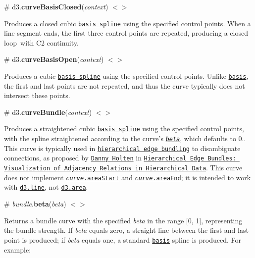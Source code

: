 \label{_curveBasisClosed}%
\# d3.{\bfseries curve\+Basis\+Closed}({\itshape context}) \href{https://github.com/d3/d3-shape/blob/master/src/curve/basisClosed.js}{\tt $<$$>$}



Produces a closed cubic \href{https://en.wikipedia.org/wiki/B-spline}{\tt basis spline} using the specified control points. When a line segment ends, the first three control points are repeated, producing a closed loop with C2 continuity.

\label{_curveBasisOpen}%
\# d3.{\bfseries curve\+Basis\+Open}({\itshape context}) \href{https://github.com/d3/d3-shape/blob/master/src/curve/basisOpen.js}{\tt $<$$>$}



Produces a cubic \href{https://en.wikipedia.org/wiki/B-spline}{\tt basis spline} using the specified control points. Unlike \href{#basis}{\tt basis}, the first and last points are not repeated, and thus the curve typically does not intersect these points.

\label{_curveBundle}%
\# d3.{\bfseries curve\+Bundle}({\itshape context}) \href{https://github.com/d3/d3-shape/blob/master/src/curve/bundle.js}{\tt $<$$>$}



Produces a straightened cubic \href{https://en.wikipedia.org/wiki/B-spline}{\tt basis spline} using the specified control points, with the spline straightened according to the curve’s \href{#curveBundle_beta}{\tt {\itshape beta}}, which defaults to 0.. This curve is typically used in \href{http://bl.ocks.org/mbostock/7607999}{\tt hierarchical edge bundling} to disambiguate connections, as proposed by \href{https://www.win.tue.nl/vis1/home/dholten/}{\tt Danny Holten} in \href{https://www.win.tue.nl/vis1/home/dholten/papers/bundles_infovis.pdf}{\tt Hierarchical Edge Bundles\+: Visualization of Adjacency Relations in Hierarchical Data}. This curve does not implement \href{#curve_areaStart}{\tt {\itshape curve}.area\+Start} and \href{#curve_areaEnd}{\tt {\itshape curve}.area\+End}; it is intended to work with \href{#lines}{\tt d3.\+line}, not \href{#areas}{\tt d3.\+area}.

\label{_curveBundle_beta}%
\# {\itshape bundle}.{\bfseries beta}({\itshape beta}) \href{https://github.com/d3/d3-shape/blob/master/src/curve/bundle.js#L51}{\tt $<$$>$}

Returns a bundle curve with the specified {\itshape beta} in the range \mbox{[}0, 1\mbox{]}, representing the bundle strength. If {\itshape beta} equals zero, a straight line between the first and last point is produced; if {\itshape beta} equals one, a standard \href{#basis}{\tt basis} spline is produced. For example\+:



